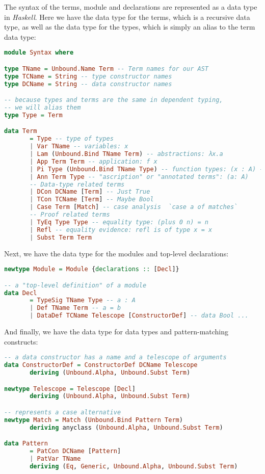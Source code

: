 \documentclass[12pt]{article}
\theoremstyle{definition}
\begin{document}
The syntax of the terms, module and declarations are represented as a data type in \emph{Haskell}.
Here we have the data type for the terms, which is a recursive data type, as well as the data type for the types, which is simply an alias to the term data type:

\begin{lstlisting}[language=Haskell]
module Syntax where

type TName = Unbound.Name Term -- Term names for our AST
type TCName = String -- type constructor names
type DCName = String -- data constructor names

-- because types and terms are the same in dependent typing,
-- we will alias them
type Type = Term

data Term
       = Type -- type of types
       | Var TName -- variables: x
       | Lam (Unbound.Bind TName Term) -- abstractions: λx.a
       | App Term Term -- application: f x
       | Pi Type (Unbound.Bind TName Type) -- function types: (x : A) -> B
       | Ann Term Type -- "ascription" or "annotated terms": (a: A)
       -- Data-type related terms
       | DCon DCName [Term] -- Just True
       | TCon TCName [Term] -- Maybe Bool
       | Case Term [Match] -- case analysis  `case a of matches`
       -- Proof related terms
       | TyEq Type Type -- equality type: (plus 0 n) = n
       | Refl -- equality evidence: refl is of type x = x
       | Subst Term Term
\end{lstlisting}
Next, we have the data type for the modules and top-level declarations:
\begin{lstlisting}[language=Haskell]
newtype Module = Module {declarations :: [Decl]}

-- a "top-level definition" of a module
data Decl
       = TypeSig TName Type -- a : A
       | Def TName Term -- a = b
       | DataDef TCName Telescope [ConstructorDef] -- data Bool ...
\end{lstlisting}
And finally, we have the data type for data types and pattern-matching constructs:
\begin{lstlisting}[language=Haskell]
-- a data constructor has a name and a telescope of arguments
data ConstructorDef = ConstructorDef DCName Telescope
       deriving (Unbound.Alpha, Unbound.Subst Term)

newtype Telescope = Telescope [Decl]
       deriving (Unbound.Alpha, Unbound.Subst Term)

-- represents a case alternative
newtype Match = Match (Unbound.Bind Pattern Term)
       deriving anyclass (Unbound.Alpha, Unbound.Subst Term)

data Pattern
       = PatCon DCName [Pattern]
       | PatVar TName
       deriving (Eq, Generic, Unbound.Alpha, Unbound.Subst Term)
\end{lstlisting}
\end{document}
